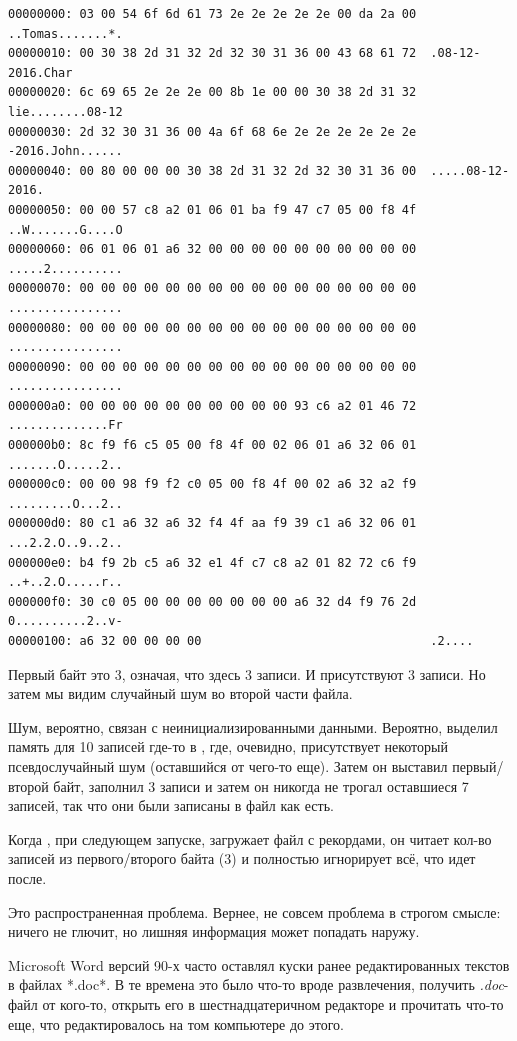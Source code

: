 \begin{lstlisting}
00000000: 03 00 54 6f 6d 61 73 2e 2e 2e 2e 2e 00 da 2a 00  ..Tomas.......*.
00000010: 00 30 38 2d 31 32 2d 32 30 31 36 00 43 68 61 72  .08-12-2016.Char
00000020: 6c 69 65 2e 2e 2e 00 8b 1e 00 00 30 38 2d 31 32  lie........08-12
00000030: 2d 32 30 31 36 00 4a 6f 68 6e 2e 2e 2e 2e 2e 2e  -2016.John......
00000040: 00 80 00 00 00 30 38 2d 31 32 2d 32 30 31 36 00  .....08-12-2016.
00000050: 00 00 57 c8 a2 01 06 01 ba f9 47 c7 05 00 f8 4f  ..W.......G....O
00000060: 06 01 06 01 a6 32 00 00 00 00 00 00 00 00 00 00  .....2..........
00000070: 00 00 00 00 00 00 00 00 00 00 00 00 00 00 00 00  ................
00000080: 00 00 00 00 00 00 00 00 00 00 00 00 00 00 00 00  ................
00000090: 00 00 00 00 00 00 00 00 00 00 00 00 00 00 00 00  ................
000000a0: 00 00 00 00 00 00 00 00 00 00 93 c6 a2 01 46 72  ..............Fr
000000b0: 8c f9 f6 c5 05 00 f8 4f 00 02 06 01 a6 32 06 01  .......O.....2..
000000c0: 00 00 98 f9 f2 c0 05 00 f8 4f 00 02 a6 32 a2 f9  .........O...2..
000000d0: 80 c1 a6 32 a6 32 f4 4f aa f9 39 c1 a6 32 06 01  ...2.2.O..9..2..
000000e0: b4 f9 2b c5 a6 32 e1 4f c7 c8 a2 01 82 72 c6 f9  ..+..2.O.....r..
000000f0: 30 c0 05 00 00 00 00 00 00 00 a6 32 d4 f9 76 2d  0..........2..v-
00000100: a6 32 00 00 00 00                                .2....
\end{lstlisting}

Первый байт это 3, означая, что здесь 3 записи.
И присутствуют 3 записи.
Но затем мы видим случайный шум во второй части файла.

Шум, вероятно, связан с неинициализированными данными.
Вероятно,  выделил память для 10 записей где-то в , где, очевидно, присутствует
некоторый псевдослучайный шум (оставшийся от чего-то еще).
Затем он выставил первый/второй байт, заполнил 3 записи и затем он никогда не трогал оставшиеся 7 записей,
так что они были записаны в файл как есть.

Когда , при следующем запуске, загружает файл с рекордами, он читает кол-во записей из первого/второго байта (3)
и полностью игнорирует всё, что идет после.

Это распространенная проблема.
Вернее, не совсем проблема в строгом смысле: ничего не глючит, но лишняя информация может попадать наружу.

Microsoft Word версий 90-х часто оставлял куски ранее редактированных текстов в файлах *.doc*.
В те времена это было что-то вроде развлечения, получить \emph{.doc}-файл от кого-то, открыть его в шестнадцатеричном редакторе
и прочитать что-то еще, что редактировалось на том компьютере до этого.

